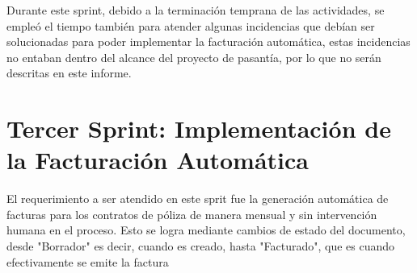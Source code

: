 \documentclass[a4paper, 12pt]{article}
\begin{document}
Durante este sprint, debido a la terminación temprana de las actividades, se empleó el tiempo también para atender algunas incidencias que debían ser solucionadas para poder implementar la facturación automática, estas incidencias no entaban dentro del alcance del proyecto de pasantía, por lo que no serán descritas en este informe.

\section{Tercer Sprint: Implementación de la Facturación Automática}
El requerimiento a ser atendido en este sprit fue la generación automática de facturas para los contratos de póliza de manera mensual y sin intervención humana en el proceso. Esto se logra mediante cambios de estado del documento, desde "Borrador" es decir, cuando es creado, hasta "Facturado", que es cuando efectivamente se emite la factura
\end{document}
